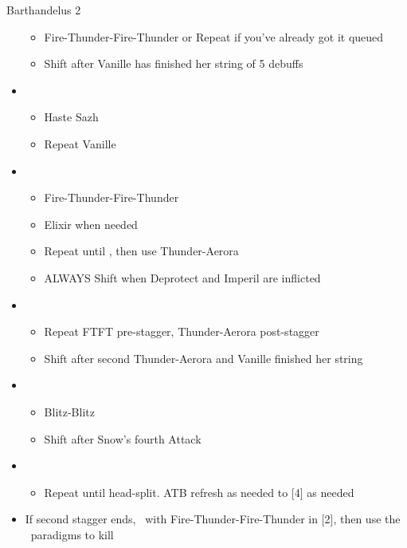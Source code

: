 \begin{battle}[2:30 $|$ 2:15]{Barthandelus 2}
\begin{multicols}{2}
\begin{itemize}
			      \begin{itemize}
				      \item Fire-Thunder-Fire-Thunder or Repeat if you've already got it queued
				      \item Shift after Vanille has finished her string of 5 debuffs
			      \end{itemize}
			\item \first
			      \begin{itemize}
				      \item Haste Sazh
				      \item Repeat Vanille
			      \end{itemize}
			\item \fifth
			      \begin{itemize}
				      \item Fire-Thunder-Fire-Thunder
				      \item Elixir when needed
				      \item Repeat until \stagger, then use Thunder-Aerora
				      \item ALWAYS Shift when Deprotect and Imperil are inflicted
			      \end{itemize}
			\item \second
			      \begin{itemize}
				      \item Repeat FTFT pre-stagger, Thunder-Aerora post-stagger
				      \item Shift after second Thunder-Aerora and Vanille finished her string
			      \end{itemize}
			\item \fourth
			      \begin{itemize}
				      \item Blitz-Blitz
				      \item Shift after Snow's fourth Attack
			      \end{itemize}
			\item \sixth
			      \begin{itemize}
				      \item Repeat until head-split. ATB refresh as needed to [4] as needed
			      \end{itemize}
			\item If second stagger ends, \stagger\ with \linebreak Fire-Thunder-Fire-Thunder in [2], then use the \com\ paradigms to kill
		\end{itemize}
		\null
	\end{multicols}
\end{battle}
